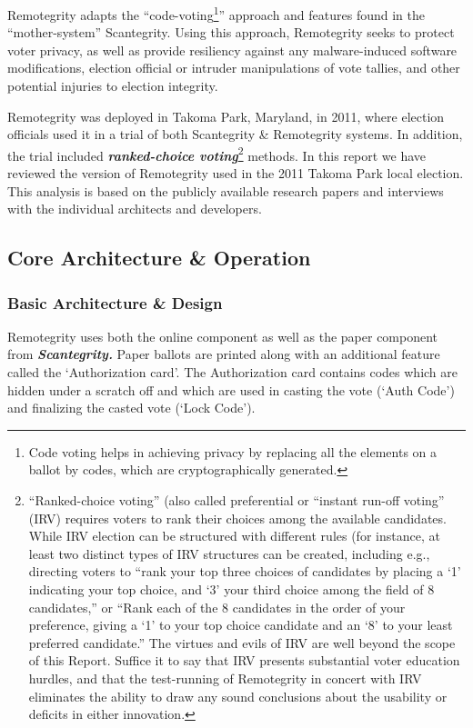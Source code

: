 Remotegrity adapts the ``code-voting\footnote{Code voting helps in
  achieving privacy by replacing all the elements on a ballot by
  codes, which are cryptographically generated.}'' approach and
features found in the ``mother-system'' Scantegrity. Using this
approach, Remotegrity seeks to protect voter privacy, as well as
provide resiliency against any malware-induced software modifications,
election official or intruder manipulations of vote tallies, and other
potential injuries to election integrity.

Remotegrity was deployed in Takoma Park, Maryland, in 2011, where
election officials used it in a trial of both Scantegrity \&
Remotegrity systems. In addition, the trial included
\textbf{\textit{ranked-choice voting}}\footnote{``Ranked-choice
  voting'' (also called preferential or ``instant run-off voting''
  (IRV) requires voters to rank their choices among the available
  candidates. While IRV election can be structured with different
  rules (for instance, at least two distinct types of IRV structures
  can be created, including e.g., directing voters to ``rank your top
  three choices of candidates by placing a `1' indicating your top
  choice, and `3' your third choice among the field of 8 candidates,''
  or ``Rank each of the 8 candidates in the order of your preference,
  giving a `1' to your top choice candidate and an `8' to your least
  preferred candidate.'' The virtues and evils of IRV are well beyond
  the scope of this Report. Suffice it to say that IRV presents
  substantial voter education hurdles, and that the test-running of
  Remotegrity in concert with IRV eliminates the ability to draw any
  sound conclusions about the usability or deficits in either
  innovation.} methods. In this report we have reviewed the version of
Remotegrity used in the 2011 Takoma Park local election. This analysis
is based on the publicly available research papers and interviews with
the individual architects and developers.

\subsection{Core Architecture \& Operation}

\subsubsection{Basic Architecture \& Design}

Remotegrity uses both the online component as well as the paper
component from \textbf{\textit{Scantegrity. }}Paper ballots are
printed along with an additional feature called the `Authorization
card'. The Authorization card contains codes which are hidden under a
scratch off and which are used in casting the vote (`Auth Code') and
finalizing the casted vote (`Lock Code').

